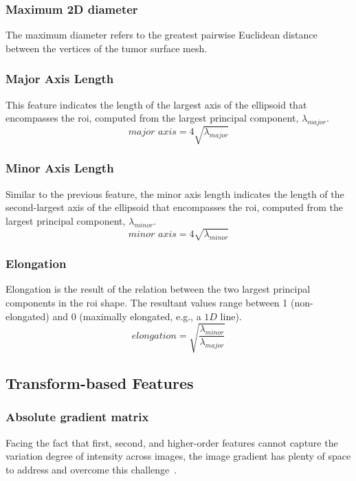 \subsubsection*{Maximum 2D diameter}
The maximum diameter refers to the greatest pairwise Euclidean distance between the vertices of the tumor surface mesh.

\subsubsection*{Major Axis Length}
This feature indicates the length of the largest axis of the ellipsoid that encompasses the \ac{roi}, computed from the largest principal component, $\lambda_{major}$.
\begin{equation}
    \textit{major axis} = 4 \sqrt{\lambda_{major}}
\end{equation}

\subsubsection*{Minor Axis Length}
Similar to the previous feature, the minor axis length indicates the length of the second-largest axis of the ellipsoid that encompasses the \ac{roi}, computed from the largest principal component, $\lambda_{minor}$.
\begin{equation}
     \textit{minor axis} = 4 \sqrt{\lambda_{minor}}
\end{equation}

\subsubsection*{Elongation}
Elongation is the result of the relation between the two largest principal components in the \ac{roi} shape. The resultant values range between 1 (non-elongated) and 0 (maximally elongated, e.g., a $1D$ line).
\begin{equation}
    \textit{elongation} = \sqrt{\frac{\lambda_{minor}}{\lambda_{major}}}
\end{equation}



\subsection{Transform-based Features}

\subsubsection{Absolute gradient matrix}
Facing the fact that first, second, and higher-order features cannot capture the variation degree of intensity across images, the image gradient has plenty of space to address and overcome this challenge~\cite{abbasian_ardakani_interpretation_2022}.

